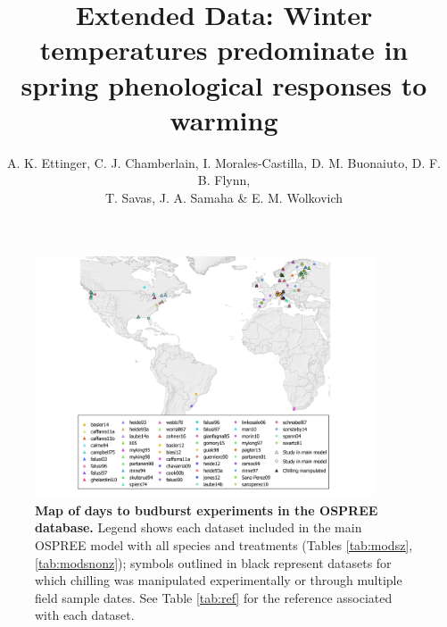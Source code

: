 \documentclass{article}
\begin{document}

\title{Extended Data:  Winter temperatures predominate in spring phenological responses to warming} 

\author{A. K. Ettinger, C. J. Chamberlain, I. Morales-Castilla, D. M. Buonaiuto, D. F. B. Flynn, \\ T. Savas, J. A. Samaha \& E. M. Wolkovich}
\date{} 
\maketitle  
\renewcommand{\thefigure}{ED\arabic{figure}}


\begin{figure}[h!]
\centering
\noindent \includegraphics[width=0.9\textwidth]{..//..//analyses/bb_analysis/figures/ospree_locations_definitive.png}
\caption{\textbf{Map of days to budburst experiments in the OSPREE database.} Legend shows each dataset included in the main OSPREE model with all species and treatments (Tables \ref{tab:modsz}, \ref{tab:modsnonz}); symbols outlined in black represent datasets for which chilling was manipulated experimentally or through multiple field sample dates. See Table \ref{tab:ref} for the reference associated with each dataset.}
\label{fig:map}
\end{figure}
\end{document}
